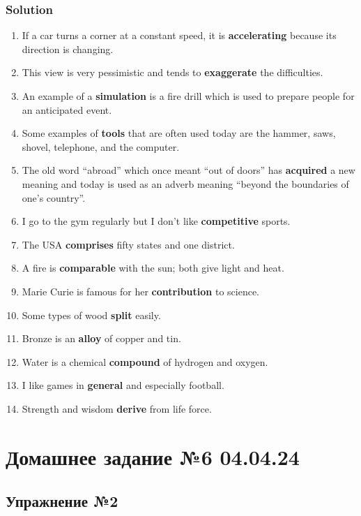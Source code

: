 \subsection*{Solution}
\begin{enumerate}
      \item If a car turns a corner at a constant speed, it is \textbf{accelerating} because its direction is changing.
      \item This view is very pessimistic and tends to \textbf{exaggerate} the difficulties.
      \item An example of a \textbf{simulation} is a fire drill which is used to prepare people for an anticipated event.
      \item Some examples of \textbf{tools} that are often used today are the hammer, saws, shovel, telephone, and the computer.
      \item The old word “abroad” which once meant “out of doors” has \textbf{acquired} a new meaning and today is used as an adverb meaning “beyond the boundaries of one’s country”.
      \item I go to the gym regularly but I don’t like \textbf{competitive} sports.
      \item The USA \textbf{comprises} fifty states and one district.
      \item A fire is \textbf{comparable} with the sun; both give light and heat.
      \item Marie Curie is famous for her \textbf{contribution} to science.
      \item Some types of wood \textbf{split} easily.
      \item Bronze is an \textbf{alloy} of copper and tin.
      \item Water is a chemical \textbf{compound} of hydrogen and oxygen.
      \item I like games in \textbf{general} and especially football.
      \item Strength and wisdom \textbf{derive} from life force.
\end{enumerate}

\chapter{Домашнее задание №6 04.04.24}

\section{Упражнение №2}
